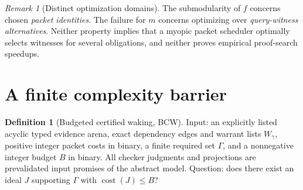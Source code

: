 \documentclass[10pt,letterpaper]{article}
\theoremstyle{definition}
\newtheorem{definition}[theorem]{Definition}
\theoremstyle{remark}
\newtheorem{remark}[theorem]{Remark}
\newcommand{\cost}{\operatorname{cost}}
\newcommand{\bn}{\textnormal{\textsc{BCW}}}
\begin{document}
\begin{remark}[Distinct optimization domains]
The submodularity of $f$ concerns chosen \emph{packet identities}. The failure for $m$ concerns optimizing over \emph{query-witness alternatives}. Neither property implies that a myopic packet scheduler optimally selects witnesses for several obligations, and neither proves empirical proof-search speedups.\end{remark}

\section{A finite complexity barrier}\label{gl-first-W2-s7}
\begin{definition}[Budgeted certified waking, \bn]
Input: an explicitly listed acyclic typed evidence arena, exact dependency edges and warrant lists $W_\gamma$, positive integer packet costs in binary, a finite required set $\Gamma$, and a nonnegative integer budget $B$ in binary. All checker judgments and projections are prevalidated input promises of the abstract model. Question: does there exist an ideal $J$ supporting $\Gamma$ with $\cost(J)\le B$?
\end{definition}
\end{document}
